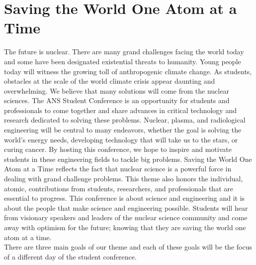 \section{Saving the World One Atom at a Time}
The future is nuclear. There are many grand challenges facing the world today and some have been designated existential threats to humanity. Young people today will witness the growing toll of anthropogenic climate change. As students, obstacles at the scale of the world climate crisis appear daunting and overwhelming. We believe that many solutions will come from the nuclear sciences. The ANS Student Conference is an opportunity for students and professionals to come together and share advances in critical technology and research dedicated to solving these problems. Nuclear, plasma, and radiological engineering will be central to many endeavors, whether the goal is solving the world’s energy needs, developing technology that will take us to the stars, or curing cancer. By hosting this conference, we hope to inspire and motivate students in these engineering fields to tackle big problems. Saving the World One Atom at a Time reflects the fact that nuclear science is a powerful force in dealing with grand challenge problems. This theme also honors the individual, atomic, contributions from students, researchers, and professionals that are essential to progress. This conference is about science and engineering and it is about the people that make science and engineering possible. Students will hear from visionary speakers and leaders of the nuclear science community and come away with optimism for the future; knowing that they are saving the world one atom at a time.\\
There are three main goals of our theme and each of these goals will be the focus of a different day of the student conference.
